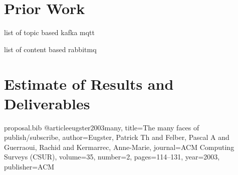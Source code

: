 \documentclass{article}
\begin{document}
\section{Prior Work}

list of topic based
kafka
mqtt

list of content based
rabbitmq
\fi


\section{Estimate of Results and Deliverables}




\begin{filecontents}{proposal.bib}
@article{eugster2003many,
  title={The many faces of publish/subscribe},
  author={Eugster, Patrick Th and Felber, Pascal A and Guerraoui, Rachid and Kermarrec, Anne-Marie},
  journal={ACM Computing Surveys (CSUR)},
  volume={35},
  number={2},
  pages={114--131},
  year={2003},
  publisher={ACM}
}
\end{filecontents}
\end{document}
